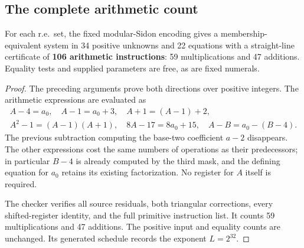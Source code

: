 \subsection{The complete arithmetic count}

\begin{theorem}\label{thm:best106}
For each r.e.\ set, the fixed modular-Sidon encoding gives a
membership-equivalent system in 34 positive unknowns and 22 equations
with a straight-line certificate of \textbf{106 arithmetic instructions}:
59 multiplications and 47 additions. Equality tests and supplied
parameters are free, as are fixed numerals.
\end{theorem}
\begin{proof}
The preceding arguments prove both directions over positive integers.
The arithmetic expressions are evaluated as
\[
\begin{gathered}
 A-4=a_0,\quad A-1=a_0+3,\quad A+1=(A-1)+2,\\
 A^2-1=(A-1)(A+1),\quad
 8A-17=8a_0+15,\quad A-B=a_0-(B-4).
\end{gathered}
\]
The previous subtraction computing the base-two coefficient $a-2$
disappears. The other expressions cost the same numbers of operations
as their predecessors; in particular $B-4$ is already computed by
the third mask, and the defining equation for $a_0$ retains its
existing factorization. No register for $A$ itself is required.

The checker 
verifies all source residuals, both triangular corrections, every
shifted-register identity, and the full primitive instruction list.
It counts 59 multiplications and 47 additions. The positive input
and equality counts are unchanged. Its generated schedule records
the exponent $L=2^{32}$.
\end{proof}
